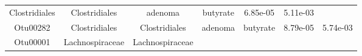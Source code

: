 \documentclass[11pt,]{article}
\begin{document}
\begin{longtable}[]{@{}ccccccc@{}}
\begin{minipage}[t]{0.17\columnwidth}
Clostridiales\strut
\end{minipage} & \begin{minipage}[t]{0.17\columnwidth}\centering\strut
Clostridiales\strut
\end{minipage} & \begin{minipage}[t]{0.09\columnwidth}\centering\strut
adenoma\strut
\end{minipage} & \begin{minipage}[t]{0.11\columnwidth}\centering\strut
butyrate\strut
\end{minipage} & \begin{minipage}[t]{0.09\columnwidth}\centering\strut
6.85e-05\strut
\end{minipage} & \begin{minipage}[t]{0.09\columnwidth}\centering\strut
5.11e-03\strut
\end{minipage}\tabularnewline
\begin{minipage}[t]{0.09\columnwidth}\centering\strut
Otu00282\strut
\end{minipage} & \begin{minipage}[t]{0.17\columnwidth}\centering\strut
Clostridiales\strut
\end{minipage} & \begin{minipage}[t]{0.17\columnwidth}\centering\strut
Clostridiales\strut
\end{minipage} & \begin{minipage}[t]{0.09\columnwidth}\centering\strut
adenoma\strut
\end{minipage} & \begin{minipage}[t]{0.11\columnwidth}\centering\strut
butyrate\strut
\end{minipage} & \begin{minipage}[t]{0.09\columnwidth}\centering\strut
8.79e-05\strut
\end{minipage} & \begin{minipage}[t]{0.09\columnwidth}\centering\strut
5.74e-03\strut
\end{minipage}\tabularnewline
\begin{minipage}[t]{0.09\columnwidth}\centering\strut
Otu00001\strut
\end{minipage} & \begin{minipage}[t]{0.17\columnwidth}\centering\strut
Lachnospiraceae\strut
\end{minipage} & \begin{minipage}[t]{0.17\columnwidth}\centering\strut
Lachnospiraceae\strut
\end{minipage} & \begin{minipage}[t]{0.09\columnwidth}\centering\strut

\end{minipage}
\end{longtable}
\end{document}
